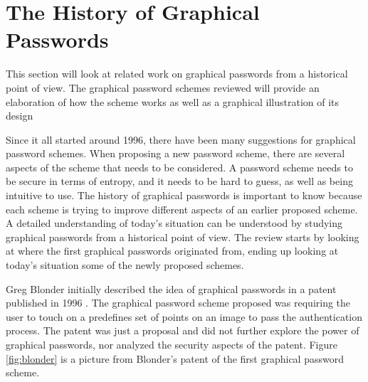 \section{The History of Graphical Passwords} \label{sec:historygraphicalpasswords}
	 
  This section will look at related work on graphical passwords from a historical point of view. The graphical password schemes reviewed will provide an elaboration of how the scheme works as well as a graphical illustration of its design

  Since it all started around 1996, there have been many suggestions for graphical password schemes. When proposing a new password scheme, there are several aspects of the scheme that needs to be considered. A password scheme needs to be secure in terms of entropy, and it needs to be hard to guess, as well as being intuitive to use. The history of graphical passwords is important to know because each scheme is trying to improve different aspects of an earlier proposed scheme. A detailed understanding of today's situation can be understood by studying graphical passwords from a historical point of view. The review starts by looking at where the first graphical passwords originated from, ending up looking at today's situation some of the newly proposed schemes.

  Greg Blonder initially described the idea of graphical passwords in a patent published in 1996 \cite{Blonder}. The graphical password scheme proposed was requiring the user to touch on a predefines set of points on an image to pass the authentication process. The patent was just a proposal and did not further explore the power of graphical passwords, nor analyzed the security aspects of the patent. Figure \ref{fig:blonder} is a picture from Blonder's patent of the first graphical password scheme.


